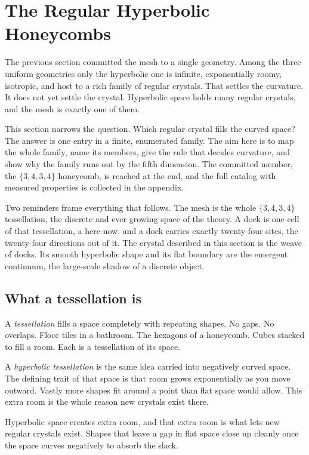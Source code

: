 \section{The Regular Hyperbolic Honeycombs}

The previous section committed the mesh to a single geometry. Among the three uniform geometries only the hyperbolic one is infinite, exponentially roomy, isotropic, and host to a rich family of regular crystals. That settles the curvature. It does not yet settle the crystal. Hyperbolic space holds many regular crystals, and the mesh is exactly one of them.

This section narrows the question. Which regular crystal fills the curved space? The answer is one entry in a finite, enumerated family. The aim here is to map the whole family, name its members, give the rule that decides curvature, and show why the family runs out by the fifth dimension. The committed member, the $\{3,4,3,4\}$ honeycomb, is reached at the end, and the full catalog with measured properties is collected in the appendix.

Two reminders frame everything that follows. The mesh is the whole $\{3,4,3,4\}$ tessellation, the discrete and ever growing space of the theory. A dock is one cell of that tessellation, a here-now, and a dock carries exactly twenty-four sites, the twenty-four directions out of it. The crystal described in this section is the weave of docks. Its smooth hyperbolic shape and its flat boundary are the emergent continuum, the large-scale shadow of a discrete object.

\subsection{What a tessellation is}

A \emph{tessellation} fills a space completely with repeating shapes. No gaps. No overlaps. Floor tiles in a bathroom. The hexagons of a honeycomb. Cubes stacked to fill a room. Each is a tessellation of its space.

A \emph{hyperbolic tessellation} is the same idea carried into negatively curved space. The defining trait of that space is that room grows exponentially as you move outward. Vastly more shapes fit around a point than flat space would allow. This extra room is the whole reason new crystals exist there.

\begin{principle}
Hyperbolic space creates extra room, and that extra room is what lets new regular crystals exist. Shapes that leave a gap in flat space close up cleanly once the space curves negatively to absorb the slack.
\end{principle}

